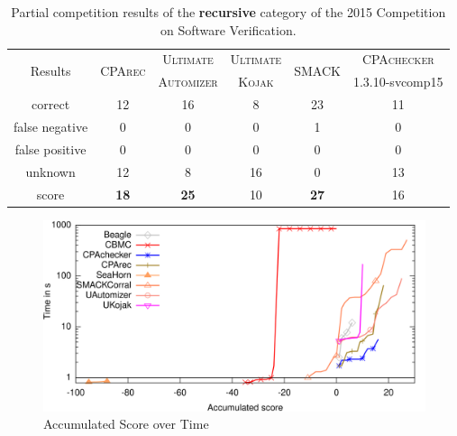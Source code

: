 \begin{table}[p]
\caption{Partial competition results of the
  \textbf{recursive} category of the 2015 Competition on Software
  Verification.\label{table:competition}}
\resizebox{\textwidth}{!}
{
\begin{tabular}{|c|cc|c|c|c|c|}
\hline
\multirow{2}{*}{Results} & \multicolumn{2}{c|}{\multirow{2}{*}{\textsc{CPArec}}} & \textsc{Ultimate} & \textsc{Ultimate} & \multirow{2}{*}{\textsc{SMACK}} & \textsc{CPAchecker} \\ 
& & & \textsc{Automizer} & \textsc{Kojak} & & 1.3.10-svcomp15\\
\hline\hline
correct          & \multicolumn{2}{c|}{12}   & 16  & 8  & 23 & 11 \\
false negative   & \multicolumn{2}{c|}{0}    & 0   & 0  & 1  & 0 \\
false positive   & \multicolumn{2}{c|}{0}    & 0   & 0  & 0  & 0 \\
unknown          & \multicolumn{2}{c|}{12}   & 8   & 16 & 0  & 13 \\
\hline\hline
score            & \multicolumn{2}{c|}{\textbf{18}}   & \textbf{25}   & 10  & \textbf{27} & 16 \\
\hline
\end{tabular}
}
\end{table}

\begin{figure}[p]
  \centering
  \includegraphics[width=\textwidth]{fig/competition-result}
  \caption{Accumulated Score over Time}
  \label{figure:accumulated-score}
\end{figure}


